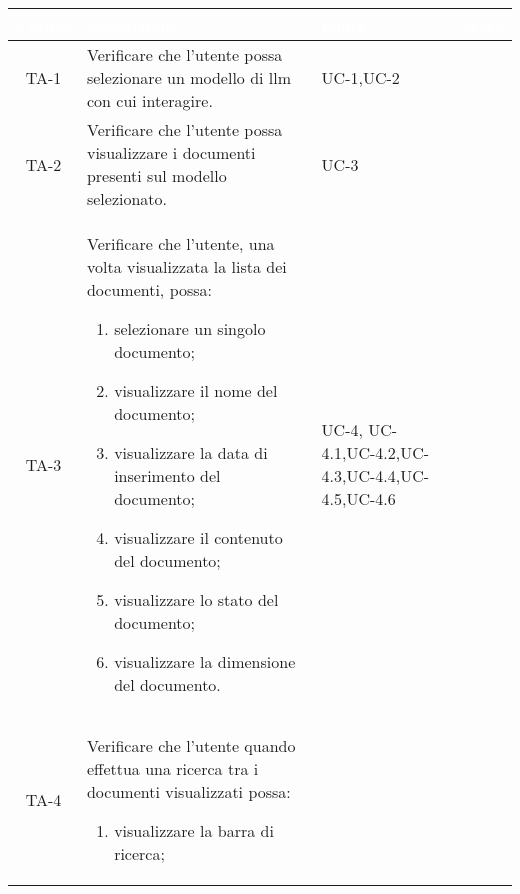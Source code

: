 \begingroup
\setlength{\tabcolsep}{10pt}
\renewcommand{\arraystretch}{1.5}
\begin{xltabular}{\textwidth}{| c | X | X | c |}
    \hline
     \textbf{\textcolor{white}{Codice}} & \textbf{\textcolor{white}{Descrizione}} & \textbf{\textcolor{white}{Fonte}} & \textbf{\textcolor{white}{Stato}}\\
    \hline
    \endhead
    \hline
    
    TA-1 & Verificare che l’utente possa selezionare un modello di llm con cui interagire. & UC-1,\newline UC-2 & \textcolor{xmarkcolor}{}  \\
    \hline
    TA-2 & Verificare che l’utente possa visualizzare i documenti presenti sul modello selezionato.
     & UC-3 &\textcolor{xmarkcolor}{}  \\
    \hline
    TA-3 & Verificare che l’utente, una volta visualizzata la lista dei documenti, possa: \begin{enumerate}
        \item selezionare un singolo documento;
        \item visualizzare il nome del documento;
        \item visualizzare la data di inserimento del documento;
        \item visualizzare il contenuto del documento;
        \item visualizzare lo stato del documento;
        \item visualizzare la dimensione del documento.
    \end{enumerate} & UC-4, \newline UC-4.1,\newline UC-4.2,\newline UC-4.3,\newline UC-4.4,\newline UC-4.5,\newline UC-4.6 & \textcolor{xmarkcolor}{}  \\
    \hline
    TA-4 & Verificare che l’utente quando effettua una ricerca tra i documenti visualizzati possa:
    \begin{enumerate}
        \item visualizzare la barra di ricerca;

\end{enumerate}
\end{xltabular}
